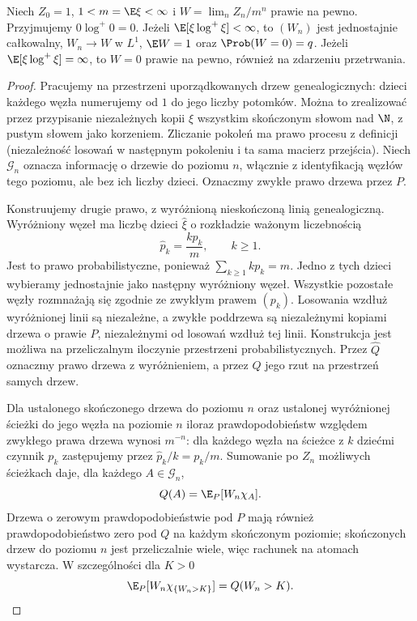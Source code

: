\begin{twierdzenie}
\label{thm:gw-kesten-stigum}
Niech $Z_0=1$, $1<m=\E\xi<\infty$ i
$W=\lim_n Z_n/m^n$ prawie na pewno.
Przyjmujemy $0\log^+0=0$.
Jeżeli $\E[\xi\log^+\xi]<\infty$, to $(W_n)$
jest jednostajnie całkowalny, $W_n\to W$ w $L^1$,
$\E W=1$ oraz $\Prob(W=0)=q$.
Jeżeli $\E[\xi\log^+\xi]=\infty$, to $W=0$
prawie na pewno, również na zdarzeniu przetrwania.
\end{twierdzenie}
\begin{proof}
Pracujemy na przestrzeni uporządkowanych drzew
genealogicznych: dzieci każdego węzła numerujemy
od $1$ do jego liczby potomków. Można to zrealizować
przez przypisanie niezależnych kopii $\xi$
wszystkim skończonym słowom nad $\N$, z pustym
słowem jako korzeniem. Zliczanie pokoleń ma
prawo procesu z definicji (niezależność losowań
w następnym pokoleniu i ta sama macierz przejścia).
Niech $\mathcal G_n$ oznacza informację o drzewie
do poziomu $n$, włącznie z identyfikacją węzłów
tego poziomu, ale bez ich liczby dzieci.
Oznaczmy zwykłe prawo drzewa przez $P$.

Konstruujemy drugie prawo, z wyróżnioną nieskończoną
linią genealogiczną. Wyróżniony węzeł ma liczbę dzieci
$\widehat\xi$ o rozkładzie ważonym liczebnością
\[
\widehat p_k=\frac{kp_k}{m},\qquad k\ge1.
\]
Jest to prawo probabilistyczne, ponieważ
$\sum_{k\ge1}kp_k=m$.
Jedno z tych dzieci wybieramy jednostajnie
jako następny wyróżniony węzeł. Wszystkie pozostałe
węzły rozmnażają się zgodnie ze zwykłym prawem
$(p_k)$. Losowania wzdłuż wyróżnionej linii
są niezależne, a zwykłe poddrzewa są niezależnymi
kopiami drzewa o prawie $P$, niezależnymi
od losowań wzdłuż tej linii. Konstrukcja jest
możliwa na przeliczalnym iloczynie przestrzeni
probabilistycznych. Przez $\widehat Q$ oznaczmy
prawo drzewa z wyróżnieniem, a przez $Q$ jego
rzut na przestrzeń samych drzew.

Dla ustalonego skończonego drzewa do poziomu $n$
oraz ustalonej wyróżnionej ścieżki do jego węzła
na poziomie $n$ iloraz prawdopodobieństw
względem zwykłego prawa drzewa wynosi $m^{-n}$:
dla każdego węzła na ścieżce z $k$ dziećmi
czynnik $p_k$ zastępujemy przez
$\widehat p_k/k=p_k/m$.
Sumowanie po $Z_n$ możliwych ścieżkach
daje, dla każdego $A\in\mathcal G_n$,
\[
Q(A)=\E_P[W_n\chi_A].
\]
Drzewa o zerowym prawdopodobieństwie pod $P$
mają również prawdopodobieństwo zero pod $Q$
na każdym skończonym poziomie; skończonych
drzew do poziomu $n$ jest przeliczalnie wiele,
więc rachunek na atomach wystarcza.
W szczególności dla $K>0$
\[
\E_P[W_n\chi_{\{W_n>K\}}]=Q(W_n>K).
\]


\end{proof}
